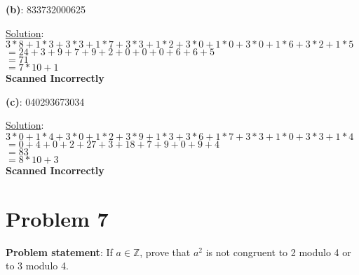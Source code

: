 \documentclass{article} %
\begin{document}
\textbf{(b)}: 833732000625
\\
\begin{addmargin}[1em]{0em}
\underline{Solution}: $3 * 8 + 1 * 3 + 3 * 3 + 1 * 7 + 3 * 3 + 1 * 2 + 3 * 0 + 1 * 0 + 3 * 0 + 1 * 6 + 3 * 2 + 1 * 5$
\\$= 24 + 3 + 9 + 7 + 9 + 2 + 0 + 0 + 0 + 6 + 6 + 5$
\\$= 71$
\\$ = 7 * 10 + 1$ 
\\ \textbf{Scanned Incorrectly}
\begin{addmargin}[1em]{0em}

\end{addmargin}
\begin{addmargin}[1em]{0em}
\end{addmargin}
\end{addmargin}

\textbf{(c)}: 040293673034
\\
\begin{addmargin}[1em]{0em}
\underline{Solution}:$3 * 0 + 1 * 4 + 3 * 0 + 1 * 2 + 3 * 9 + 1 * 3 + 3 * 6 + 1 * 7 + 3 * 3 + 1 * 0 + 3 * 3 + 1 * 4$
\\$= 0 + 4 + 0 + 2 + 27 + 3 + 18 + 7 + 9 + 0 + 9 + 4$
\\$= 83$
\\$ = 8 * 10 + 3$
\\ \textbf{Scanned Incorrectly}
\begin{addmargin}[1em]{0em}

\end{addmargin}
\begin{addmargin}[1em]{0em}
\end{addmargin}
\end{addmargin}

\newpage

\section*{Problem 7}


\textbf{Problem statement}: If $a \in \mathbb{Z}$, prove that $a^2$ is not congruent to 2 modulo 4 or to 3 modulo 4.
\\
\end{document}
